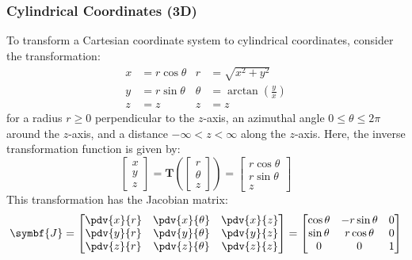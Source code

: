 \documentclass{article}
\begin{document}
\subsubsection{Cylindrical Coordinates (3D)}
To transform a Cartesian coordinate system to cylindrical coordinates,
consider the transformation:
\begin{align*}
    x & = r \cos{\theta} & r      & = \sqrt{x^2 + y^2}                    \\
    y & = r \sin{\theta} & \theta & = \arctan{\left( \frac{y}{x} \right)} \\
    z & = z              & z      & = z
\end{align*}
for a radius \(r \geqslant 0\) perpendicular to the \(z\)-axis, an
azimuthal angle \(0 \leqslant \theta \leqslant 2\pi\) around the
\(z\)-axis, and a distance \(-\infty < z < \infty\) along the
\(z\)-axis. Here, the inverse transformation function is given by:
\begin{equation*}
    \begin{bmatrix}
        x \\
        y \\
        z
    \end{bmatrix}
    = \symbf{T}\left(
    \begin{bmatrix}
        r      \\
        \theta \\
        z
    \end{bmatrix}
    \right) =
    \begin{bmatrix}
        r \cos{\theta} \\
        r \sin{\theta} \\
        z
    \end{bmatrix}
\end{equation*}
This transformation has the Jacobian matrix:
\begin{equation*}
    \symbf{J} =
    \begin{bmatrix}
        \displaystyle\pdv{x}{r} & \displaystyle\pdv{x}{\theta} & \displaystyle\pdv{x}{z} \\
        \displaystyle\pdv{y}{r} & \displaystyle\pdv{y}{\theta} & \displaystyle\pdv{y}{z} \\
        \displaystyle\pdv{z}{r} & \displaystyle\pdv{z}{\theta} & \displaystyle\pdv{z}{z}
    \end{bmatrix}
    =
    \begin{bmatrix}
        \cos{\theta} & -r \sin{\theta} & 0 \\
        \sin{\theta} & r \cos{\theta}  & 0 \\
        0            & 0               & 1
    \end{bmatrix}
\end{equation*}
\end{document}
